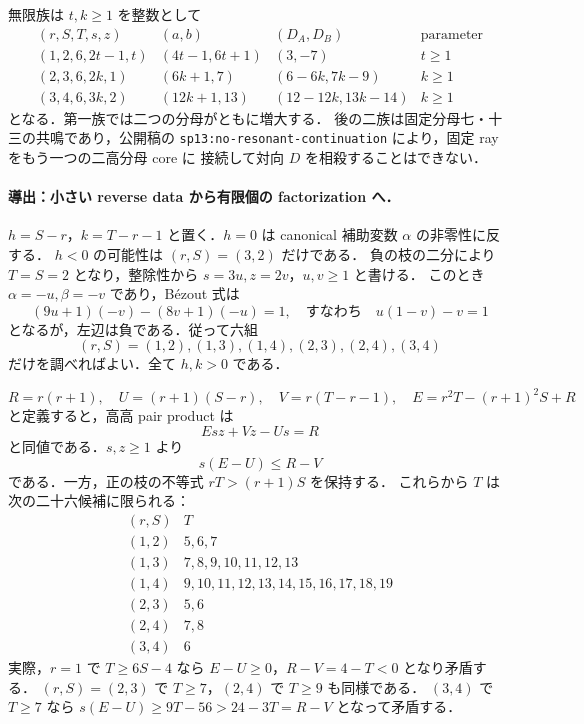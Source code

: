 無限族は $t,k\geq1$ を整数として
\[
\begin{array}{c|c|c|c}
 (r,S,T,s,z)&(a,b)&(D_A,D_B)&\text{parameter}\\\hline
 (1,2,6,2t-1,t)&(4t-1,6t+1)&(3,-7)&t\geq1\\
 (2,3,6,2k,1)&(6k+1,7)&(6-6k,7k-9)&k\geq1\\
 (3,4,6,3k,2)&(12k+1,13)&(12-12k,13k-14)&k\geq1
\end{array}
\]
となる．第一族では二つの分母がともに増大する．
後の二族は固定分母七・十三の共鳴であり，公開稿の
\texttt{sp13:no-resonant-continuation} により，固定 ray をもう一つの二高分母 core に
接続して対向 $D$ を相殺することはできない．

\paragraph{導出：小さい reverse data から有限個の factorization へ．}
$h=S-r$，$k=T-r-1$ と置く．$h=0$ は canonical 補助変数 $\alpha$ の非零性に反する．
$h<0$ の可能性は $(r,S)=(3,2)$ だけである．
負の枝の二分により $T=S=2$ となり，整除性から $s=3u,z=2v$，$u,v\geq1$ と書ける．
このとき $\alpha=-u,\beta=-v$ であり，Bézout 式は
\[
 (9u+1)(-v)-(8v+1)(-u)=1,
 \quad\text{すなわち}\quad u(1-v)-v=1
\]
となるが，左辺は負である．従って六組
\[
 (r,S)=(1,2),(1,3),(1,4),(2,3),(2,4),(3,4)
\]
だけを調べればよい．全て $h,k>0$ である．

\[
 R=r(r+1),\quad U=(r+1)(S-r),\quad V=r(T-r-1),
 \quad E=r^2T-(r+1)^2S+R
\]
と定義すると，高高 pair product は
\begin{equation}\label{nr13:bilinear}
 Esz+Vz-Us=R
\end{equation}
と同値である．$s,z\geq1$ より
\begin{equation}\label{nr13:T-bound}
 s(E-U)\leq R-V
\end{equation}
である．一方，正の枝の不等式 $rT>(r+1)S$ を保持する．
これらから $T$ は次の二十六候補に限られる：
\[
\begin{array}{c|c}
 (r,S)&T\\\hline
 (1,2)&5,6,7\\
 (1,3)&7,8,9,10,11,12,13\\
 (1,4)&9,10,11,12,13,14,15,16,17,18,19\\
 (2,3)&5,6\\
 (2,4)&7,8\\
 (3,4)&6
\end{array}
\]
実際，$r=1$ で $T\geq6S-4$ なら $E-U\geq0$，$R-V=4-T<0$ となり矛盾する．
$(r,S)=(2,3)$ で $T\geq7$，$(2,4)$ で $T\geq9$ も同様である．
$(3,4)$ で $T\geq7$ なら
$s(E-U)\geq9T-56>24-3T=R-V$ となって矛盾する．

